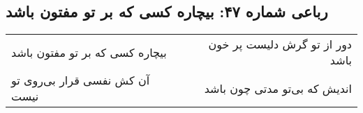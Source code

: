 \begin{center}
\section*{رباعی شماره ۴۷: بیچاره کسی که بر تو مفتون باشد}
\label{sec:047}
\begin{longtable}{l p{0.5cm} r}
بیچاره کسی که بر تو مفتون باشد
&&
دور از تو گرش دلیست پر خون باشد
\\
آن کش نفسی قرار بی‌روی تو نیست
&&
اندیش که بی‌تو مدتی چون باشد
\\
\end{longtable}
\end{center}
